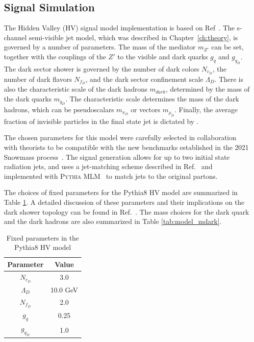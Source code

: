 \subsection{Signal Simulation}
\label{subsec:signals}

The Hidden Valley (HV) signal model implementation is based on Ref~\cite{darkqcd}. 
The s-channel semi-visible jet model, which was described in Chapter~\ref{ch:theory}, is governed by a number of parameters. 
The mass of the mediator $m_{Z'}$ can be set, together with the couplings of the $Z'$ to the visible and dark quarks $g_q$ and $g_{q_D}$. 
The dark sector shower is governed by the number of dark colors $N_{c_D}$, the number of dark flavors $N_{f_D}$, and the dark sector confinement scale $\Lambda_D$. 
There is also the characteristic scale of the dark hadrons $m_{dark}$, determined by the mass of the dark quarks $m_{q_D}$. 
The characteristic scale determines the mass of the dark hadrons, which can be pseudoscalars $m_{\pi_D}$ or vectors $m_{\rho_D}$.
Finally, the average fraction of invisible particles in the final state jet is dictated by \rinv. 

The chosen parameters for this model were carefully selected in collaboration with theorists to be compatible with the new benchmarks established in the 2021 Snowmass process~\cite{snowmass}. 
The signal generation allows for up to two initial state radiation jets, and uses a jet-matching scheme described in Ref.~\cite{mlm} and implemented with \textsc{Pythia MLM}~\cite{pythia} to match jets to the original partons.

The choices of fixed parameters for the Pythia8 HV model are summarized in Table \ref{tab:model_fixed_params}.
A detailed discussion of these parameters and their implications on the dark shower topology can be found in Ref.~\cite{snowmass}. 
The mass choices for the dark quark and the dark hadrons are also summarized in Table \ref{tab:model_mdark}. 

\begin{table}
\centering
  \begin{tabular}{ |c|c| }
    \hline
    Parameter & Value \\
    \hline
     $N_{c_D}$ & 3.0 \\
     $\Lambda_D$ & 10.0 GeV\\
     $N_{f_D}$ & 2.0\\
     $g_q$ & 0.25\\
     $g_{q_D}$ & 1.0\\
    \hline
  \end{tabular}
  \caption{Fixed parameters in the Pythia8 HV model}
  \label{tab:model_fixed_params}
\end{table}

